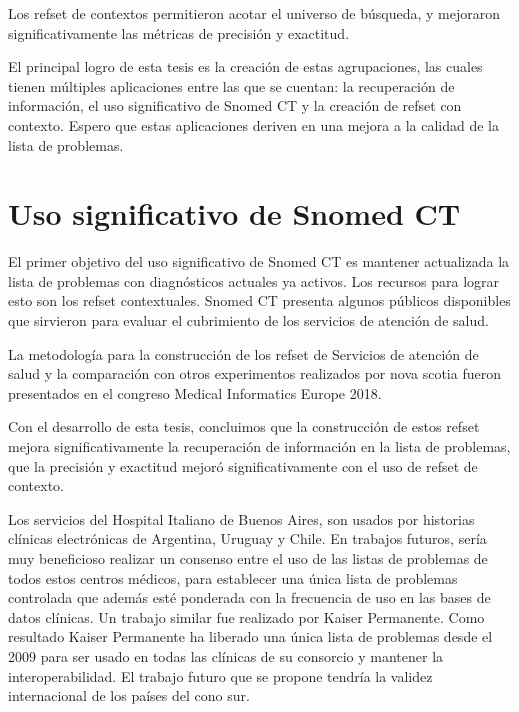 Los \acrshort{refset} de contextos permitieron acotar el universo de búsqueda, y mejoraron significativamente las métricas de precisión y exactitud.

El principal logro de esta tesis es la creación de estas agrupaciones, las cuales tienen múltiples aplicaciones entre las que se cuentan: la recuperación de información, el uso significativo de Snomed CT y la creación de \acrshort{refset} con contexto. Espero que estas aplicaciones deriven en una mejora a la calidad de la lista de problemas.

\section{Uso significativo de Snomed CT}
El primer objetivo del uso significativo de Snomed CT es mantener actualizada la lista de problemas con diagnósticos actuales ya activos. Los recursos para lograr esto son los \acrshort{refset} contextuales. Snomed CT  presenta algunos públicos disponibles que sirvieron para evaluar el cubrimiento de los servicios de atención de salud.\cite{meaningfuluse}

La metodología para la construcción de los \acrshort{refset} de Servicios de atención de salud y la comparación con otros experimentos realizados por nova scotia\cite{nova} fueron presentados en el congreso Medical Informatics Europe 2018.\cite{Avila2018SelectionSubsets.}

Con el desarrollo de esta tesis, concluimos que la construcción de estos \acrshort{refset} mejora significativamente la recuperación de información en la lista de problemas, que la precisión y exactitud mejoró significativamente con el uso de \acrshort{refset} de contexto.

Los servicios del Hospital Italiano de Buenos Aires, son usados por historias clínicas electrónicas de Argentina, Uruguay y Chile. En trabajos futuros, sería muy beneficioso realizar un consenso entre el uso de las listas de problemas de todos estos centros médicos, para establecer una única lista de problemas controlada que además esté ponderada con la frecuencia de uso en las bases de datos clínicas. Un trabajo similar fue realizado por Kaiser Permanente. Como resultado Kaiser Permanente ha liberado una única lista de problemas desde el 2009 para ser usado en todas las clínicas de su consorcio y mantener la interoperabilidad\cite{Dolin2004KaiserTerminology.}. El trabajo futuro que se propone tendría la validez internacional de los países del cono sur.

